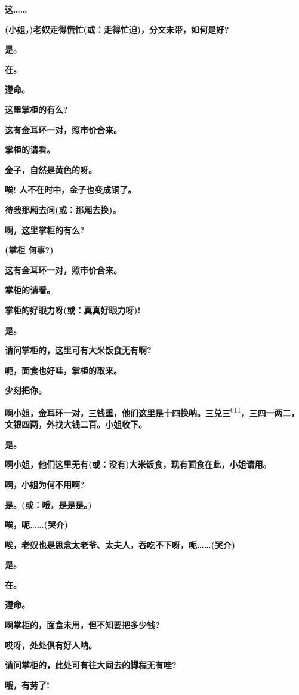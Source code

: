 \textbf{这\ldots{}\ldots{}}

\textbf{(小姐，)老奴走得慌忙(或：走得忙迫)，分文未带，如何是好?}

\textbf{是。}

\textbf{在。}

\textbf{遵命。}

\textbf{这里掌柜的有么?}

\textbf{这有金耳环一对，照市价合来。}

\textbf{掌柜的请看。}

\textbf{金子，自然是黄色的呀。}

\textbf{唉! 人不在时中，金子也变成铜了。}

\textbf{待我那厢去问(或：那厢去换)。}

\textbf{啊，这里掌柜的有么?}

\textbf{(掌柜 何事?)}

\textbf{这有金耳环一对，照市价合来。}

\textbf{掌柜的请看。}

\textbf{掌柜的好眼力呀(或：真真好眼力呀)!}

\textbf{是。}

\textbf{请问掌柜的，这里可有大米饭食无有啊?}

\textbf{呃，面食也好哇，掌柜的取来。}

\textbf{少刻把你。}

\textbf{啊小姐，金耳环一对，三钱重，他们这里是十四换呐。三兑三}\protect\hyperlink{fn611}{\textsuperscript{611}}\textbf{，三四一两二，文银四两，外找大钱二百。小姐收下。}

\textbf{是。}

\textbf{啊小姐，他们这里无有(或：没有)大米饭食，现有面食在此，小姐请用。}

\textbf{啊，小姐为何不用啊?}

\textbf{是。(或：哦，是是是。)}

\textbf{唉，呃\ldots{}\ldots{}(哭介)}

\textbf{唉，老奴也是思念太老爷、太夫人，吞吃不下呀，呃\ldots{}\ldots{}(哭介)}

\textbf{是。}

\textbf{在。}

\textbf{遵命。}

\textbf{啊掌柜的，面食未用，但不知要把多少钱?}

\textbf{哎呀，处处俱有好人呐。}

\textbf{请问掌柜的，此处可有往大同去的脚程无有哇?}

\textbf{哦，有劳了!}

